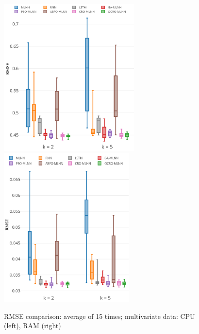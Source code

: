 \documentclass[11pt,twoside]{article}
\begin{document}
\begin{multicols}{2}
\begin{figure}
	\centering
	\begin{minipage}[h]{1\textwidth}
		\centering
		\includegraphics[width=0.45\textwidth =0cm 0cm 0cm 0cm, height = 8cm]{images/pdf/stability/st_cpu_2.pdf}
		\centering
		\includegraphics[width=0.45\textwidth =0cm 0cm 0cm 0cm, height = 8.1cm]{images/pdf/stability/st_ram_2.pdf}
	\end{minipage}
	\caption{RMSE comparison: average of 15 times; multivariate data: CPU (left), RAM (right)} 
	\label{fig:stability_multi}
\end{figure}


\end{multicols}
\end{document}
